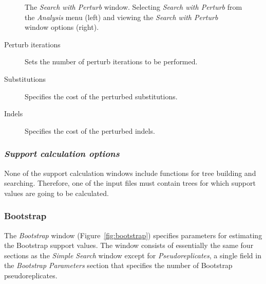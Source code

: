 \begin{figure}
\begin{minipage}[c]{0.48\textwidth}
   	\end{minipage} 
\caption{The \emph{Search with Perturb} window. Selecting \emph{Search with Perturb} from the \emph{Analysis} menu (left) and viewing the \emph{Search with Perturb} window options (right).}
\label{fig:search_with_perturb_window}
\end{figure}

\begin{description}
    \item[Perturb iterations] Sets the number of perturb iterations to be performed.
    \item[Substitutions] Specifies the cost of the perturbed substitutions.
    \item[Indels] Specifies the cost of the perturbed indels.
\end{description}

\subsubsection{\emph{Support calculation options}}

None of the support calculation windows include functions for tree building and searching. Therefore, one of the input files must contain trees for which support values are going to be calculated.

\subsubsection{Bootstrap}

The \emph{Bootstrap} window (Figure~\ref{fig:bootstrap}) specifies parameters
for estimating the Bootstrap support values. The window consists
of essentially the same four sections as the \emph{Simple Search} window
except for \emph{Pseudoreplicates}, a single field in the \emph{Bootstrap Parameters} section that specifies the number of Bootstrap pseudoreplicates.

